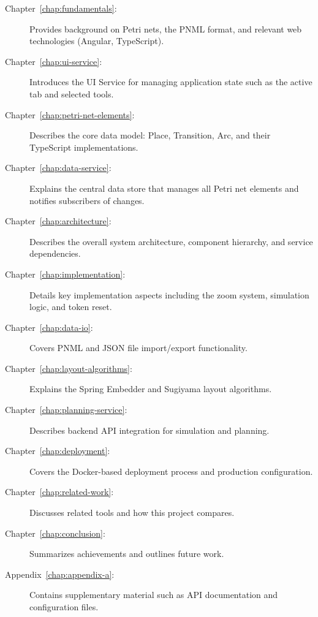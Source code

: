 \begin{description}
    \item[Chapter~\ref{chap:fundamentals}:] Provides background on Petri nets, the PNML format, and relevant web technologies (Angular, TypeScript).
    
    \item[Chapter~\ref{chap:ui-service}:] Introduces the UI Service for managing application state such as the active tab and selected tools.
    
    \item[Chapter~\ref{chap:petri-net-elements}:] Describes the core data model: Place, Transition, Arc, and their TypeScript implementations.
    
    \item[Chapter~\ref{chap:data-service}:] Explains the central data store that manages all Petri net elements and notifies subscribers of changes.
    
    \item[Chapter~\ref{chap:architecture}:] Describes the overall system architecture, component hierarchy, and service dependencies.
    
    \item[Chapter~\ref{chap:implementation}:] Details key implementation aspects including the zoom system, simulation logic, and token reset.
    
    \item[Chapter~\ref{chap:data-io}:] Covers PNML and JSON file import/export functionality.
    
    \item[Chapter~\ref{chap:layout-algorithms}:] Explains the Spring Embedder and Sugiyama layout algorithms.
    
    \item[Chapter~\ref{chap:planning-service}:] Describes backend API integration for simulation and planning.
    
    \item[Chapter~\ref{chap:deployment}:] Covers the Docker-based deployment process and production configuration.
    
    \item[Chapter~\ref{chap:related-work}:] Discusses related tools and how this project compares.
    
    \item[Chapter~\ref{chap:conclusion}:] Summarizes achievements and outlines future work.
    
    \item[Appendix~\ref{chap:appendix-a}:] Contains supplementary material such as API documentation and configuration files.
\end{description}

